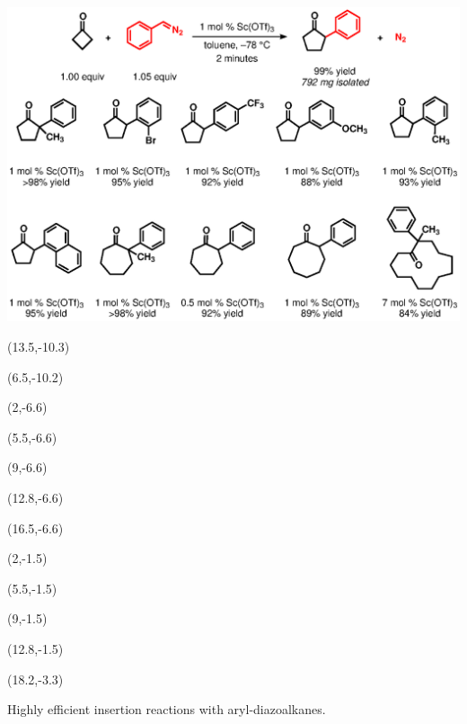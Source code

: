 \begin{Scheme}[h]
  \centering
  \includegraphics[scale=0.8]{chp_asymmetric/images/rendinapspsubstrates}
  \begin{textblock}{1}(13.5,-10.3)  \end{textblock}
  \begin{textblock}{1}(6.5,-10.2)  \end{textblock}
  \begin{textblock}{1}(2,-6.6)  \end{textblock}
  \begin{textblock}{1}(5.5,-6.6)  \end{textblock}
  \begin{textblock}{1}(9,-6.6)  \end{textblock}
  \begin{textblock}{1}(12.8,-6.6)  \end{textblock}
  \begin{textblock}{1}(16.5,-6.6)  \end{textblock}
\begin{textblock}{1}(2,-1.5)  \end{textblock}
\begin{textblock}{1}(5.5,-1.5)  \end{textblock}
\begin{textblock}{1}(9,-1.5)  \end{textblock}
\begin{textblock}{1}(12.8,-1.5)  \end{textblock}
\begin{textblock}{1}(18.2,-3.3)  \end{textblock}
  \caption{Highly efficient insertion reactions with aryl-diazoalkanes.}
  \label{sch:asrendinapspsubstrates}
\end{Scheme}  

